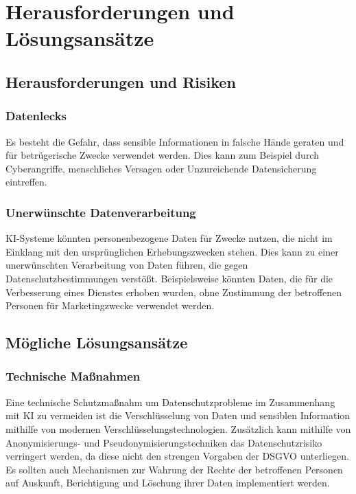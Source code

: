 \chapter{Herausforderungen und Lösungsansätze}

\section{Herausforderungen und Risiken}

\subsection{Datenlecks}

Es besteht die Gefahr, dass sensible Informationen in falsche Hände geraten und
für betrügerische Zwecke verwendet werden. Dies kann zum Beispiel durch
Cyberangriffe, menschliches Versagen oder Unzureichende Datensicherung
eintreffen.

\cite{digitalesinstitut2024}

\subsection{Unerwünschte Datenverarbeitung}

KI-Systeme könnten personenbezogene Daten für Zwecke nutzen, die nicht im
Einklang mit den ursprünglichen Erhebungszwecken stehen. Dies kann zu einer
unerwünschten Verarbeitung von Daten führen, die gegen Datenschutzbestimmungen
verstößt. Beispielsweise könnten Daten, die für die Verbesserung eines Dienstes
erhoben wurden, ohne Zustimmung der betroffenen Personen für Marketingzwecke
verwendet werden.

\cite{digitalesinstitut2024}

\section{Mögliche Lösungsansätze}

\subsection{Technische Maßnahmen}

Eine technische Schutzmaßnahm um Datenschutzprobleme im Zusammenhang mit KI zu
vermeiden ist die Verschlüsselung von Daten und sensiblen Information mithilfe
von modernen Verschlüsselungstechnologien. Zusätzlich kann mithilfe von
Anonymisierungs- und Pseudonymisierungstechniken das Datenschutzrisiko
verringert werden, da diese nicht den strengen Vorgaben der DSGVO unterliegen.
Es sollten auch Mechanismen zur Wahrung der Rechte der betroffenen Personen auf
Auskunft, Berichtigung und Löschung ihrer Daten implementiert werden.

